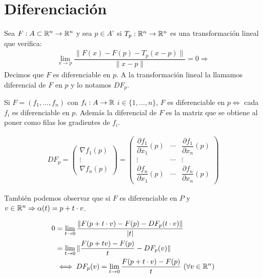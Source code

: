 \section{Diferenciación}

\begin{definition}
  Sea \(F : A \subset \mathbb{R}^n \to \mathbb{R}^n\) y sea \(p \in A^{\circ} \) si \(T_p : \mathbb{R}^n \to \mathbb{R}^n\) es una transformación lineal que verifica:
  \begin{align*}
    \lim_{x \to p} \dfrac{\| F(x) - F(p) - T_p(x-p) \|}{\|x-p\|} = 0 \Rightarrow
  \end{align*} Decimos que \(F\) es diferenciable en \(p\). A la transformación lineal la llamamos diferencial de \(F\) en \(p\) y lo notamos \(DF_p\).
\end{definition}

Si \(F = (f_1, \ldots, f_n)\) con \(f_i: A \to \mathbb{R} \) \(i \in \{1, \ldots, n\} \), \(F\) es diferenciable en \(p \iff \) cada \(f_i\) es diferenciable en \(p\).
Además la diferencial de \(F\) es la matriz que se obtiene al poner como filas los gradientes de \(f_i\).

\begin{align*}
  DF_p = \begin{pmatrix}
           \nabla f_1(p) \\
           \vdots        \\
           \nabla f_n(p)
         \end{pmatrix} = \begin{pmatrix}
                           \dfrac{\partial f_1}{\partial x_1}(p) & \cdots & \dfrac{\partial f_1}{\partial x_n}(p) \\
                           \vdots                                & \cdots & \vdots                                \\
                           \dfrac{\partial f_n}{\partial x_1}(p) & \cdots & \dfrac{\partial f_n}{\partial x_n}(p)
                         \end{pmatrix}
\end{align*}

También podemos observar que si \(F\) es diferenciable en \(P\) y \(v \in \mathbb{R}^n \Rightarrow \alpha(t) = p + t \cdot v\).

\begin{align*}
  0 & = \lim_{t \to 0} \dfrac{\| F(p + t \cdot v) - F(p) - DF_p(t \cdot v) \|}{|t|}                 \\
    & = \lim_{t \to 0} \| \dfrac{F(p + tv) - F(p)}{t} - DF_p(v) \|                                  \\
    & \iff DF_p(v) = \lim_{t \to 0} \dfrac{F(p+t \cdot v) - F(p)}{t} \text{  } (\forall v \in \mathbb{R}^n)
\end{align*}

